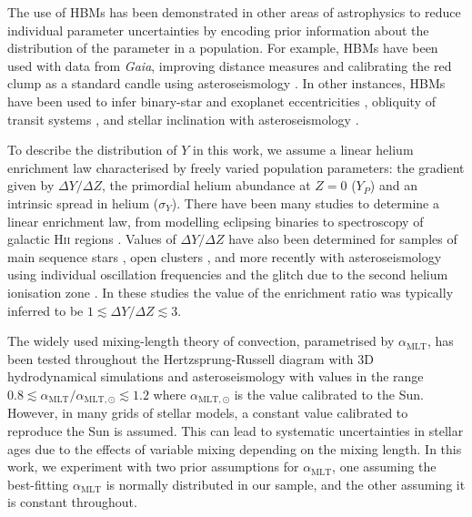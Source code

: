 \documentclass[fleqn,usenatbib]{mnras}
\newcommand{\mlt}{\ensuremath{{\alpha_\mathrm{MLT}}}}
\begin{document}
The use of HBMs has been demonstrated in other areas of astrophysics to reduce individual parameter uncertainties by encoding prior information about the distribution of the parameter in a population. For example, HBMs have been used with data from \emph{Gaia}, improving distance measures \citep{Leistedt.Hogg2017, Anderson.Hogg.ea2018} and calibrating the red clump as a standard candle \citep{Hawkins.Leistedt.ea2017, Chan.Bovy2020} using asteroseismology \citep{Hall.Davies.ea2019}. In other instances, HBMs have been used to infer binary-star and exoplanet eccentricities \citep{Hogg.Myers.ea2010}, obliquity of transit systems \citep{Morton.Winn2014}, and stellar inclination with asteroseismology \citep{Campante.Lund.ea2016, Kuszlewicz.Chaplin.ea2019}.

To describe the distribution of $Y$ in this work, we assume a linear helium enrichment law characterised by freely varied population parameters: the gradient given by $\Delta Y / \Delta Z$, the primordial helium abundance at $Z=0$ ($Y_P$) and an intrinsic spread in helium ($\sigma_Y$). There have been many studies to determine a linear enrichment law, from modelling eclipsing binaries \citep{Ribas.Jordi.ea2000} to spectroscopy of galactic H\textsc{ii} regions \citep{Balser2006}. Values of $\Delta Y / \Delta Z$ have also been determined for samples of main sequence stars \citep{Casagrande.Flynn.ea2007}, open clusters \citep{Brogaard.VandenBerg.ea2012}, and more recently with asteroseismology using individual oscillation frequencies \citep{SilvaAguirre.Lund.ea2017} and the glitch due to the second helium ionisation zone \citep{Verma.Raodeo.ea2019}. In these studies the value of the enrichment ratio was typically inferred to be $1 \lesssim \Delta Y / \Delta Z \lesssim 3$.

The widely used mixing-length theory of convection, parametrised by $\mlt$, has been tested throughout the Hertzsprung-Russell diagram with 3D hydrodynamical simulations \citep{Trampedach.Stein.ea2014, Magic.Weiss.ea2015} and asteroseismology \citep{Tayar.Somers.ea2017, Viani.Basu.ea2018, Li.Bedding.ea2018} with values in the range $0.8 \lesssim \mlt/\alpha_{\mathrm{MLT}, \odot} \lesssim 1.2$ where $\alpha_{\mathrm{MLT}, \odot}$ is the value calibrated to the Sun. However, in many grids of stellar models, a constant value calibrated to reproduce the Sun is assumed. This can lead to systematic uncertainties in stellar ages due to the effects of variable mixing depending on the mixing length. In this work, we experiment with two prior assumptions for $\mlt$, one assuming the best-fitting $\mlt$ is normally distributed in our sample, and the other assuming it is constant throughout.
\end{document}
